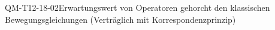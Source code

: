 
\begin{CONC}{QM-T12-18-02}{Erwartungswert von Operatoren gehorcht den klassischen Bewegungsgleichungen (Verträglich mit Korrespondenzprinzip)}
\end{CONC}
